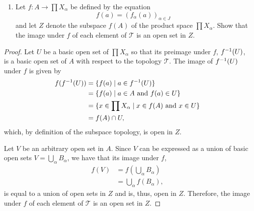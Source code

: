\begin{solution}
    \begin{enumerate}[label={(\alph*)}, align=left, leftmargin=\parindent, listparindent=\parindent, labelwidth=0pt, itemindent=!]
        \addtocounter{enumi}{3} 
        \item Let $f: A \rightarrow \prod X_\alpha$ be defined by the equation
        \begin{equation*}
            f(a) = (f_\alpha(a))_{\alpha \in J}
        \end{equation*}
        and let $Z$ denote the subspace $f(A)$ of the product space $\prod X_\alpha$.
        Show that the image under $f$ of each element of $\mathcal{T}$ is an open set in $Z$.
    \end{enumerate}
    \begin{proof}
        Let $U$ be a basic open set of $\prod X_\alpha$ so that its preimage under $f$, $f^{-1}(U)$, is a basic open set of $A$ with respect to the topology $\mathcal{T}$.
        The image of $f^{-1}(U)$ under $f$ is given by
        \begin{align*}
            f(f^{-1}(U)) &= \{f(a) \mid a \in f^{-1}(U)\} \\
                        &= \{f(a) \mid a \in A \text{ and } f(a) \in U\} \\
                        &= \{x \in \prod X_\alpha \mid x \in f(A) \text{ and } x \in U\} \\
                        &= f(A) \cap U,
        \end{align*}
        which, by definition of the subspace topology, is open in $Z$.

        Let $V$ be an arbitrary open set in $A$.
        Since $V$ can be expressed as a union of basic open sets $V = \bigcup_\alpha B_\alpha$, we have that its image under $f$,
        \begin{align*}
            f(V)    &= f(\bigcup_\alpha B_\alpha) \\
                    &= \bigcup_\alpha f(B_\alpha),
        \end{align*}
        is equal to a union of open sets in $Z$ and is, thus, open in $Z$.
        Therefore, the image under $f$ of each element of $\mathcal{T}$ is an open set in $Z$.
    \end{proof}
\end{solution}
\newpage

